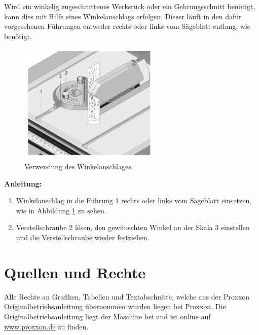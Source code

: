 \documentclass{\basedir/fablab-document}
\begin{document}
Wird ein winkelig zugeschnittenes Werkstück oder ein Gehrungsschnitt benötigt, kann dies mit Hilfe eines Winkelanschlags erfolgen. Dieser läuft in den dafür vorgesehenen Führungen entweder rechts oder links vom Sägeblatt entlang, wie benötigt.

\begin{figure} [h]
	\centering
	\includegraphics[width=0.6\textwidth]{bilder/Winkelanschlag.pdf}
	\caption{Verwendung des Winkelanschlages}
	\label{fig:winkelanschlag}
\end{figure}

\textbf{Anleitung:} \\
\renewcommand{\labelenumi}{\alph{enumi})}
\begin{enumerate}
	\item Winkelanschlag in die Führung 1 rechts oder links vom Sägeblatt einsetzen, wie in Abbildung \ref{fig:winkelanschlag} zu sehen.
	\item Verstellschraube 2 lösen, den gewünschten Winkel an der Skala 3 einstellen und die Verstellschraube wieder festziehen.

\end{enumerate}


\section{Quellen und Rechte}
\label{quellen}
Alle Rechte an Grafiken, Tabellen und Textabschnitte, welche aus der Proxxon Originalbetriebsanleitung übernommen wurden liegen bei Proxxon. Die Originalbetriebsanleitung liegt der Maschine bei und ist online auf \url{www.proxxon.de} zu finden.

\end{document}
